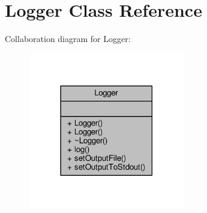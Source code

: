\hypertarget{classLogger}{\section{Logger Class Reference}
\label{classLogger}
}


Collaboration diagram for Logger\-:\nopagebreak
\begin{figure}[H]
\begin{center}
\leavevmode
\includegraphics[width=194pt]{classLogger__coll__graph}
\end{center}
\end{figure}
